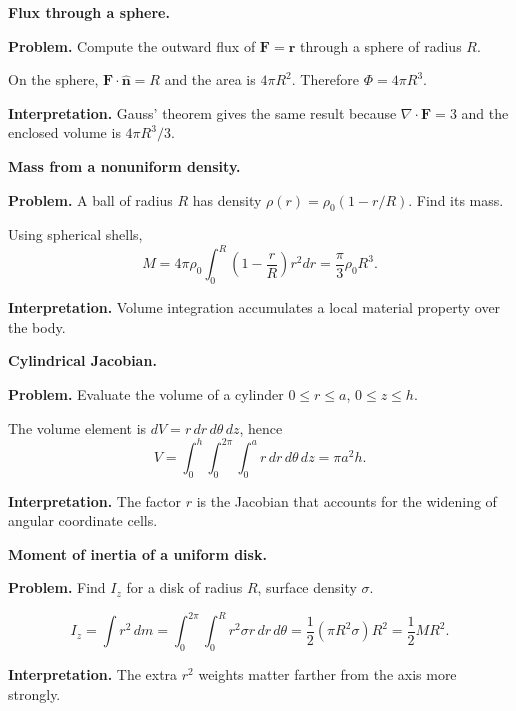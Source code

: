 \begin{workedexample}
\textbf{Flux through a sphere.}\par
\textbf{Problem.} Compute the outward flux of $\mathbf F=\mathbf r$ through a sphere of radius $R$.
\begin{solution}
On the sphere, $\mathbf F\cdot\hat{\mathbf n}=R$ and the area is $4\pi R^2$. Therefore $\Phi=4\pi R^3$.

\textbf{Interpretation.} Gauss' theorem gives the same result because $\nabla\cdot\mathbf F=3$ and the enclosed volume is $4\pi R^3/3$.
\end{solution}
\end{workedexample}

\begin{workedexample}
\textbf{Mass from a nonuniform density.}\par
\textbf{Problem.} A ball of radius $R$ has density $\rho(r)=\rho_0(1-r/R)$. Find its mass.
\begin{solution}
Using spherical shells,
\[
M=4\pi\rho_0\int_0^R\left(1-\frac rR\right)r^2dr
=\frac{\pi}{3}\rho_0R^3.
\]

\textbf{Interpretation.} Volume integration accumulates a local material property over the body.
\end{solution}
\end{workedexample}

\begin{workedexample}
\textbf{Cylindrical Jacobian.}\par
\textbf{Problem.} Evaluate the volume of a cylinder $0\le r\le a$, $0\le z\le h$.
\begin{solution}
The volume element is $dV=r\,dr\,d\theta\,dz$, hence
\[
V=\int_0^h\int_0^{2\pi}\int_0^a r\,dr\,d\theta\,dz=\pi a^2h.
\]

\textbf{Interpretation.} The factor $r$ is the Jacobian that accounts for the widening of angular coordinate cells.
\end{solution}
\end{workedexample}

\begin{workedexample}
\textbf{Moment of inertia of a uniform disk.}\par
\textbf{Problem.} Find $I_z$ for a disk of radius $R$, surface density $\sigma$.
\begin{solution}
\[
I_z=\int r^2\,dm=\int_0^{2\pi}\int_0^R r^2\sigma r\,dr\,d\theta
=\frac12(\pi R^2\sigma)R^2=\frac12MR^2.
\]

\textbf{Interpretation.} The extra $r^2$ weights matter farther from the axis more strongly.
\end{solution}
\end{workedexample}

